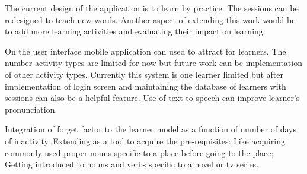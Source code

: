 \documentclass[11pt,a4paper]{article}
\begin{document}
The current design of the application is to learn by practice. The sessions can be redesigned to teach new words. Another aspect of extending this work would be to add more learning activities and evaluating their impact on learning.

On the user interface mobile application can used to attract for learners. The number activity types are limited for now but future work can be implementation of other activity types. Currently this system is one learner limited but after implementation of login screen and maintaining the database of learners with sessions can also be a helpful feature. Use of text to speech can improve learner's pronunciation. 

Integration of forget factor to the learner model as a function of number of days of inactivity.
Extending as a tool to acquire the pre-requisites: Like acquiring commonly used proper nouns specific to a place before going to the place; Getting introduced to nouns and verbs specific to a novel or tv series.




\end{document}
